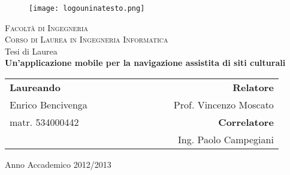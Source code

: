 



\frontmatter
\begin{titlepage}
\vskip 2.5cm

 \begin{center}
     \begin{figure}
      \texttt{[image: logouninatesto.png]}
     \end{figure}
    
     \vspace{4em}
     {\Large \textsc{Facoltà di Ingegneria}}\\
     \vspace{1em}
     {\small \textsc{Corso di Laurea in Ingegneria Informatica}}\\
     \vspace{3em}
	 {\normalsize Tesi di Laurea}\\
     \vspace{7em}
     {\LARGE \textbf{Un'applicazione mobile per la navigazione assistita di siti culturali}}\\
 \end{center}

\vskip 2.5cm
  \begin{center}
    \begin{tabular}{l c c c c c c c c r}
      \textbf{Laureando} & & & & & & & & & \textbf{Relatore} \\[0.2cm]
      \large{Enrico Bencivenga} & & & & & & & & & \large{Prof. Vincenzo Moscato}\\[0.4cm]
         \large{matr. 534000442} & & & & & & & & & \textbf{Correlatore} \\[0.2cm]
        & & & & & & & & & \large{Ing. Paolo Campegiani} \\
    \end{tabular}
  \end{center}
  
\vskip 2cm
\begin{center}
  \normalsize Anno Accademico 2012/2013
\end{center}

\end{titlepage}

